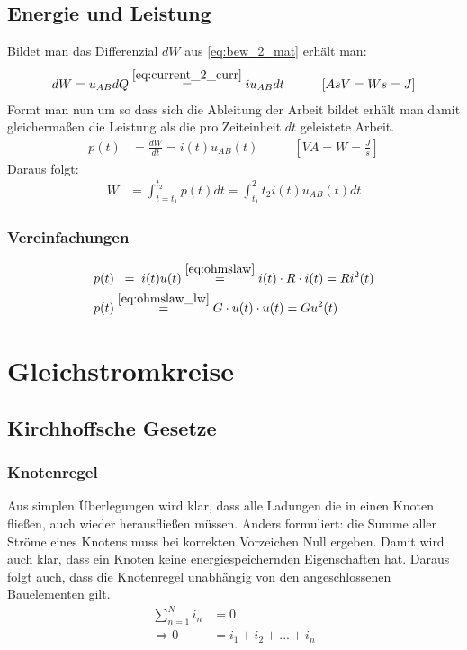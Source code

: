 \documentclass[12pt,a4paper]{article}%
\numberwithin{equation}{section}
\begin{document}
\subsection{Energie und Leistung}
Bildet man das Differenzial $dW$ aus \eqref{eq:bew_2_mat} erhält man:
\begin{align}
dW &= u_{AB}dQ \overset{\eqref{eq:current_2_curr}}{=} iu_{AB}dt \qquad &\left[AsV = Ws = J \right]
\end{align}
Formt man nun um so dass sich die Ableitung der Arbeit bildet erhält man damit gleichermaßen die Leistung als die pro Zeiteinheit $dt$ geleistete Arbeit.
\begin{align}
p(t) &= \frac{dW}{dt} = i(t) u_{AB}(t) \qquad &\left[VA = W = \frac{J}{s} \right]
\end{align}
Daraus folgt:
\begin{align}
W &= \int_{t=t_1}^{t_2} p(t) dt = \int_{t_1}^2{t_2} i(t) u_{AB}(t) dt
\end{align}

\subsubsection{Vereinfachungen}
\begin{align}
p(t) &\;\;= \;i(t) u(t) \overset{\eqref{eq:ohmslaw}}{=} i(t)\cdot R \cdot i(t) = R i^2(t) \\
p(t) &\overset{\eqref{eq:ohmslaw_lw}}{=} G \cdot u(t) \cdot u(t) = G u^2(t) 
\end{align}

\section{Gleichstromkreise}
\subsection{Kirchhoffsche Gesetze}
\subsubsection{Knotenregel} \label{sec:kirch_1}
Aus simplen Überlegungen wird klar, dass alle Ladungen die in einen Knoten fließen, auch wieder herausfließen müssen. Anders formuliert: die Summe aller Ströme eines Knotens muss bei korrekten Vorzeichen Null ergeben. Damit wird auch klar, dass ein Knoten keine energiespeichernden Eigenschaften hat. Daraus folgt auch, dass die Knotenregel unabhängig von den angeschlossenen Bauelementen gilt. 
\begin{align}
\sum_{n=1}^N i_n &= 0 \\ \nonumber
\Rightarrow 0 &= i_1 + i_2 + ... + i_n
\end{align} 
\end{document}
